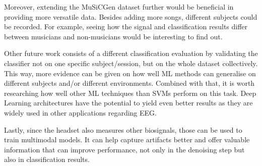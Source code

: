     Moreover, extending the \ac{MuSiCGen} dataset further would be beneficial in providing more versatile data. Besides adding more songs, different subjects could be recorded. For example, seeing how the signal and classification results differ between musicians and non-musicians would be interesting to find out. \par
    Other future work consists of a different classification evaluation by validating the classifier not on one specific subject/session, but on the whole dataset collectively. This way, more evidence can be given on how well \ac{ML} methods can generalise on different subjects and/or different environments. Combined with that, it is worth researching how well other \ac{ML} techniques than \acp{SVM} perform on this task. Deep Learning architectures have the potential to yield even better results as they are widely used in other applications regarding \ac{EEG}. \par
    Lastly, since the headset also measures other biosignals, those can be used to train multimodal models. It can help capture artifacts better and offer valuable information that can improve performance, not only in the denoising step but also in classification results.

